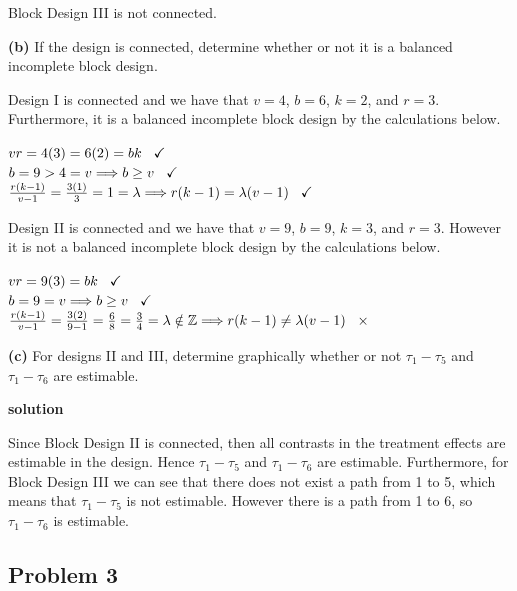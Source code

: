 \documentclass[12pt,]{article}
\begin{document}
Block Design III is not connected.

\textbf{(b)} If the design is connected, determine whether or not it is
a balanced incomplete block design.

Design I is connected and we have that \(v=4\), \(b=6\), \(k=2\), and
\(r=3\). Furthermore, it is a balanced incomplete block design by the
calculations below.

\begin{center}
$vr = 4(3) = 6(2) = bk \hspace{.3cm}  \checkmark$\\
$b= 9 > 4 =v \Longrightarrow b \geq v \hspace{.3cm}  \checkmark$\\
$\frac{r(k-1)}{v-1} = \frac{3(1)}{3} = 1 = \lambda \Longrightarrow r(k-1) = \lambda (v-1)  \hspace{.3cm} \checkmark$
\end{center}

Design II is connected and we have that \(v=9\), \(b=9\), \(k=3\), and
\(r=3\). However it is not a balanced incomplete block design by the
calculations below.

\begin{center}
$vr = 9(3) = bk \hspace{.3cm}  \checkmark$\\
$b= 9 = v \Longrightarrow b \geq v \hspace{.3cm}  \checkmark$\\
$\frac{r(k-1)}{v-1} = \frac{3(2)}{9-1} = \frac{6}{8} = \frac{3}{4} = \lambda  \notin \mathbb{Z} \Longrightarrow r(k-1) \neq \lambda (v-1)  \hspace{.3cm} \times$
\end{center}

\textbf{(c)} For designs II and III, determine graphically whether or
not \(\tau_1 - \tau_5\) and \(\tau_1 - \tau_6\) are estimable.

\textbf{solution}

Since Block Design II is connected, then all contrasts in the treatment
effects are estimable in the design. Hence \(\tau_1 - \tau_5\) and
\(\tau_1 - \tau_6\) are estimable. Furthermore, for Block Design III we
can see that there does not exist a path from 1 to 5, which means that
\(\tau_1 - \tau_5\) is not estimable. However there is a path from 1 to
6, so \(\tau_1 - \tau_6\) is estimable.

\subsection{Problem 3}\label{problem-3}
\end{document}
